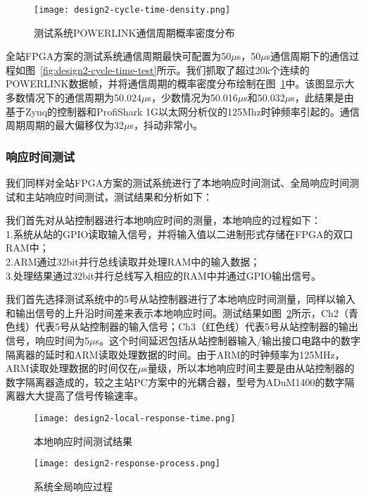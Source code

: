 \begin{figure}[!htb]
  \centering
  \texttt{[image: design2-cycle-time-density.png]}
  \caption{测试系统POWERLINK通信周期概率密度分布}
  \label{fig:design2-cycle-time-density}
\end{figure}

全站FPGA方案的测试系统通信周期最快可配置为50$\mu$s，50$\mu$s通信周期下的通信过程如图~\ref{fig:design2-cycle-time-test}所示。我们抓取了超过20k个连续的POWERLINK数据帧，并将通信周期的概率密度分布绘制在图~\ref{fig:design2-cycle-time-density}中。该图显示大多数情况下的通信周期为50.024$\mu$s，少数情况为50.016$\mu$s和50.032$\mu$s，此结果是由基于Zynq的控制器和ProfiShark 1G以太网分析仪的125Mhz时钟频率引起的。通信周期周期的最大偏移仅为32$\mu$s，抖动非常小。

\subsubsection{响应时间测试}
\label{subsubsection:全FPGA方案的响应时间测试}
我们同样对全站FPGA方案的测试系统进行了本地响应时间测试、全局响应时间测试和主站响应时间测试，测试结果和分析如下：

我们首先对从站控制器进行本地响应时间的测量，本地响应的过程如下：\\
1.系统从站的GPIO读取输入信号，并将输入值以二进制形式存储在FPGA的双口RAM中；\\
2.ARM通过32bit并行总线读取并处理RAM中的输入数据；\\
3.处理结果通过32bit并行总线写入相应的RAM中并通过GPIO输出信号。

我们首先选择测试系统中的5号从站控制器进行了本地响应时间测量，同样以输入和输出信号的上升沿时间差来表示本地响应时间。测试结果如图~\ref{fig:design2-local-response-time}所示，Ch2（青色线）代表5号从站控制器的输入信号；Ch3（红色线）代表5号从站控制器的输出信号，响应时间为5$\mu$s。这个时间延迟包括从站控制器输入/输出接口电路中的数字隔离器的延时和ARM读取处理数据的时间。由于ARM的时钟频率为125MHz，ARM读取处理数据的时间仅在$\mu$s量级，所以本地响应时间主要是由从站控制器的数字隔离器造成的，较之主站PC方案中的光耦合器，型号为ADuM1400的数字隔离器大大提高了信号传输速率。

\begin{figure}[!htb]
  \centering
  \texttt{[image: design2-local-response-time.png]}
  \caption{本地响应时间测试结果}
  \label{fig:design2-local-response-time}
\end{figure}

\begin{figure}[!htb]
  \centering
  \texttt{[image: design2-response-process.png]}
  \caption{系统全局响应过程}
  \label{fig:design2-response-process}
\end{figure}

